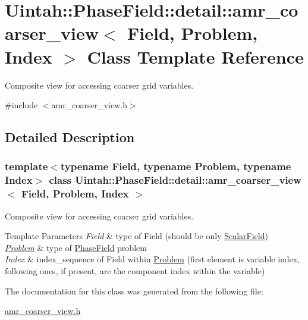 \hypertarget{classUintah_1_1PhaseField_1_1detail_1_1amr__coarser__view}{}\section{Uintah\+:\+:Phase\+Field\+:\+:detail\+:\+:amr\+\_\+coarser\+\_\+view$<$ Field, Problem, Index $>$ Class Template Reference}
\label{classUintah_1_1PhaseField_1_1detail_1_1amr__coarser__view}


Composite view for accessing coarser grid variables.  




{\ttfamily \#include $<$amr\+\_\+coarser\+\_\+view.\+h$>$}



\subsection{Detailed Description}
\subsubsection*{template$<$typename Field, typename Problem, typename Index$>$\newline
class Uintah\+::\+Phase\+Field\+::detail\+::amr\+\_\+coarser\+\_\+view$<$ Field, Problem, Index $>$}

Composite view for accessing coarser grid variables. 


\begin{DoxyTemplParams}{Template Parameters}
{\em Field} & type of Field (should be only \hyperlink{structUintah_1_1PhaseField_1_1ScalarField}{Scalar\+Field}) \\
\hline
{\em \hyperlink{classUintah_1_1PhaseField_1_1Problem}{Problem}} & type of \hyperlink{namespaceUintah_1_1PhaseField}{Phase\+Field} problem \\
\hline
{\em Index} & index\+\_\+sequence of Field within \hyperlink{classUintah_1_1PhaseField_1_1Problem}{Problem} (first element is variable index, following ones, if present, are the component index within the variable) \\
\hline
\end{DoxyTemplParams}


The documentation for this class was generated from the following file\+:\begin{DoxyCompactItemize}
\item 
\hyperlink{amr__coarser__view_8h}{amr\+\_\+coarser\+\_\+view.\+h}\end{DoxyCompactItemize}
